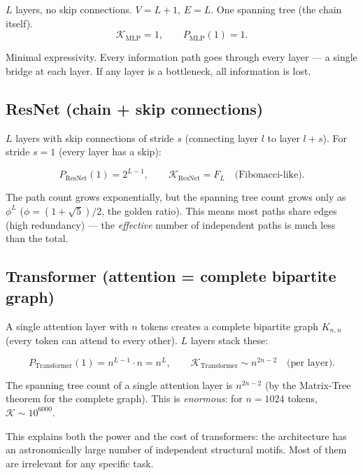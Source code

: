 \documentclass[11pt,a4paper]{article}
\newcommand{\K}{\mathcal{K}}
\begin{document}
$L$ layers, no skip connections.  $V = L+1$, $E = L$.  One
spanning tree (the chain itself).
\begin{equation}
\K_{\text{MLP}} = 1, \qquad P_{\text{MLP}}(1) = 1.
\end{equation}

Minimal expressivity.  Every information path goes through every
layer --- a single bridge at each layer.  If any layer is a
bottleneck, all information is lost.

\subsection{ResNet (chain + skip connections)}

$L$ layers with skip connections of stride $s$ (connecting layer
$l$ to layer $l+s$).  For stride $s=1$ (every layer has a skip):

\begin{equation}
P_{\text{ResNet}}(1) = 2^{L-1}, \qquad
\K_{\text{ResNet}} = F_L \quad \text{(Fibonacci-like)}.
\end{equation}

The path count grows exponentially, but the spanning tree count
grows only as $\phi^L$ ($\phi = (1+\sqrt{5})/2$, the golden ratio).
This means most paths share edges (high redundancy) --- the
\emph{effective} number of independent paths is much less than
the total.

\subsection{Transformer (attention = complete bipartite graph)}

A single attention layer with $n$ tokens creates a complete
bipartite graph $K_{n,n}$ (every token can attend to every other).
$L$ layers stack these:

\begin{equation}
P_{\text{Transformer}}(1) = n^{L-1} \cdot n = n^L, \qquad
\K_{\text{Transformer}} \sim n^{2n-2} \quad \text{(per layer)}.
\end{equation}

The spanning tree count of a single attention layer is $n^{2n-2}$
(by the Matrix-Tree theorem for the complete graph).  This is
\emph{enormous}: for $n = 1024$ tokens, $\K \sim 10^{6000}$.

This explains both the power and the cost of transformers: the
architecture has an astronomically large number of independent
structural motifs.  Most of them are irrelevant for any specific
task.
\end{document}
